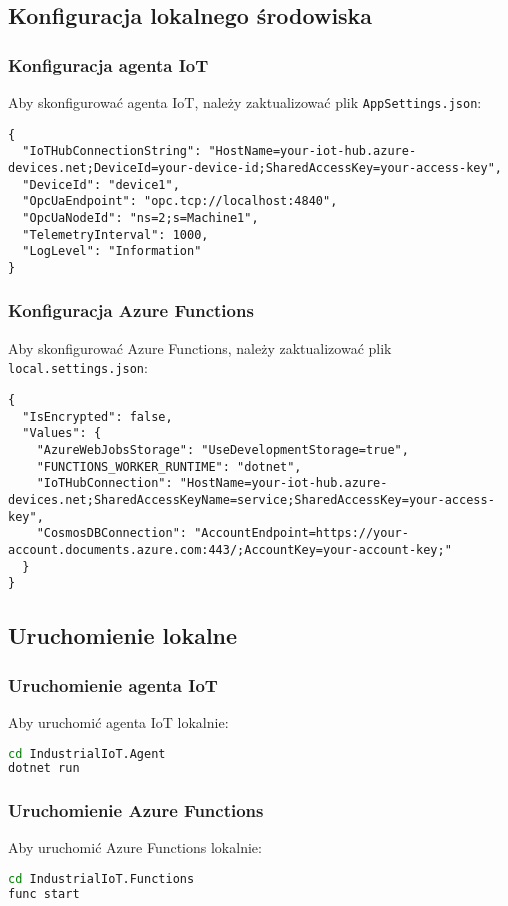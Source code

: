 \documentclass{article}
\begin{document}
\subsection{Konfiguracja lokalnego środowiska}
\subsubsection{Konfiguracja agenta IoT}
Aby skonfigurować agenta IoT, należy zaktualizować plik \texttt{AppSettings.json}:

\begin{lstlisting}[style=json, caption=AppSettings.json]
{
  "IoTHubConnectionString": "HostName=your-iot-hub.azure-devices.net;DeviceId=your-device-id;SharedAccessKey=your-access-key",
  "DeviceId": "device1",
  "OpcUaEndpoint": "opc.tcp://localhost:4840",
  "OpcUaNodeId": "ns=2;s=Machine1",
  "TelemetryInterval": 1000,
  "LogLevel": "Information"
}
\end{lstlisting}

\subsubsection{Konfiguracja Azure Functions}
Aby skonfigurować Azure Functions, należy zaktualizować plik \texttt{local.settings.json}:

\begin{lstlisting}[style=json, caption=local.settings.json]
{
  "IsEncrypted": false,
  "Values": {
    "AzureWebJobsStorage": "UseDevelopmentStorage=true",
    "FUNCTIONS_WORKER_RUNTIME": "dotnet",
    "IoTHubConnection": "HostName=your-iot-hub.azure-devices.net;SharedAccessKeyName=service;SharedAccessKey=your-access-key",
    "CosmosDBConnection": "AccountEndpoint=https://your-account.documents.azure.com:443/;AccountKey=your-account-key;"
  }
}
\end{lstlisting}

\subsection{Uruchomienie lokalne}
\subsubsection{Uruchomienie agenta IoT}
Aby uruchomić agenta IoT lokalnie:
\begin{lstlisting}[language=bash]
cd IndustrialIoT.Agent
dotnet run
\end{lstlisting}

\subsubsection{Uruchomienie Azure Functions}
Aby uruchomić Azure Functions lokalnie:
\begin{lstlisting}[language=bash]
cd IndustrialIoT.Functions
func start
\end{lstlisting}
\end{document}

